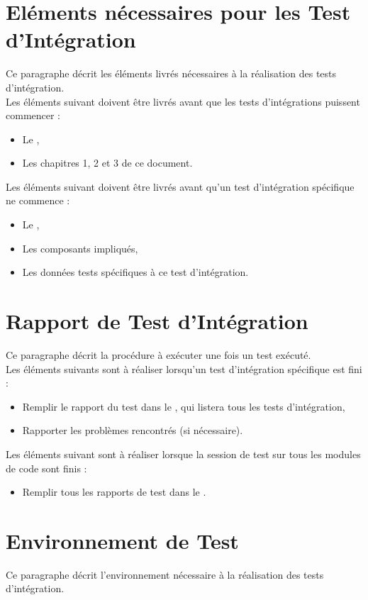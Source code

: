   
  
  \section{Eléments nécessaires pour les Test d'Intégration}
  	Ce paragraphe décrit les éléments livrés nécessaires à la réalisation des tests d'intégration. \\
  	
  	Les éléments suivant doivent être livrés avant que les tests d'intégrations puissent commencer :
  	\begin{itemize}
  		\item Le \PTU,
  		\item Les chapitres 1, 2 et 3 de ce document.
  	\end{itemize}
  	
  	Les éléments suivant doivent être livrés avant qu'un test d'intégration spécifique ne commence :
  	\begin{itemize}
  		\item Le \JTU,
  		\item Les composants impliqués,
  		\item Les données tests spécifiques à ce test d'intégration.
  	\end{itemize}
  
  \section{Rapport de Test d'Intégration}  
  	Ce paragraphe décrit la procédure à exécuter une fois un test exécuté.  \\
  	
  	Les éléments suivants sont à réaliser lorsqu'un test d'intégration spécifique est fini : 
  	\begin{itemize}
  		\item Remplir le rapport du test dans le \JTI, qui listera tous les tests d'intégration,
  		\item Rapporter les problèmes rencontrés (si nécessaire).
  	\end{itemize}
  	
  	Les éléments suivant sont à réaliser  lorsque la session de test sur tous les modules de code sont finis : 
  	\begin{itemize}
  		\item Remplir tous les rapports de test dans le \JTI.
  	\end{itemize}
  
  \section{Environnement de Test}
	  Ce paragraphe décrit l'environnement nécessaire à la réalisation des tests d'intégration. \\
	  
